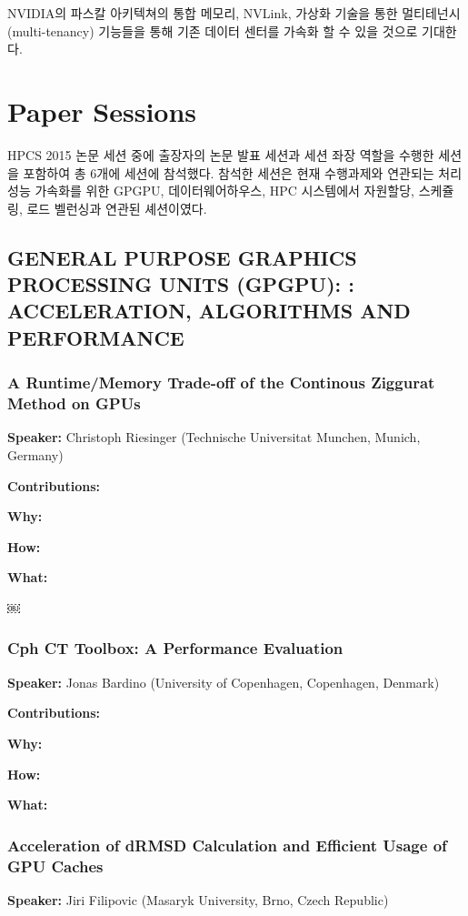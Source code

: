\documentclass[twocolumn]{article}
\begin{document}
NVIDIA의 파스칼 아키텍쳐의 통합 메모리, NVLink, 가상화 기술을 통한 멀티테넌시 (multi-tenancy) 기능들을 통해 기존 데이터 센터를 가속화 할 수 있을 것으로 기대한다. 

\section{Paper Sessions}
HPCS 2015 논문 세션 중에 출장자의 논문 발표 세션과 세션 좌장 역할을 수행한 세션을 포함하여 총 6개에 세션에 참석했다. 참석한 세션은 현재 수행과제와 연관되는 처리성능 가속화를 위한 GPGPU, 데이터웨어하우스, HPC 시스템에서 자원할당,  스케쥴링, 로드 벨런싱과 연관된 셰션이였다.

\subsection{GENERAL PURPOSE GRAPHICS PROCESSING UNITS (GPGPU): : ACCELERATION, ALGORITHMS AND PERFORMANCE}

\subsubsection{A Runtime/Memory Trade-off of the Continous Ziggurat Method on GPUs}
\textbf{Speaker:} Christoph Riesinger (Technische Universitat Munchen, Munich, Germany)

\noindent
\textbf{Contributions:}  

\noindent
\textbf{Why:}  

\noindent
\textbf{How:}  

\noindent
\textbf{What:}  

￼\subsubsection{Cph CT Toolbox: A Performance Evaluation}
\textbf{Speaker:} Jonas Bardino (University of Copenhagen, Copenhagen, Denmark)

\noindent
\textbf{Contributions:}  

\noindent
\textbf{Why:}  

\noindent
\textbf{How:}  

\noindent
\textbf{What:}  

\subsubsection{Acceleration of dRMSD Calculation and Efficient Usage of GPU Caches}
\textbf{Speaker:} Jiri Filipovic (Masaryk University, Brno, Czech Republic)
\end{document}
